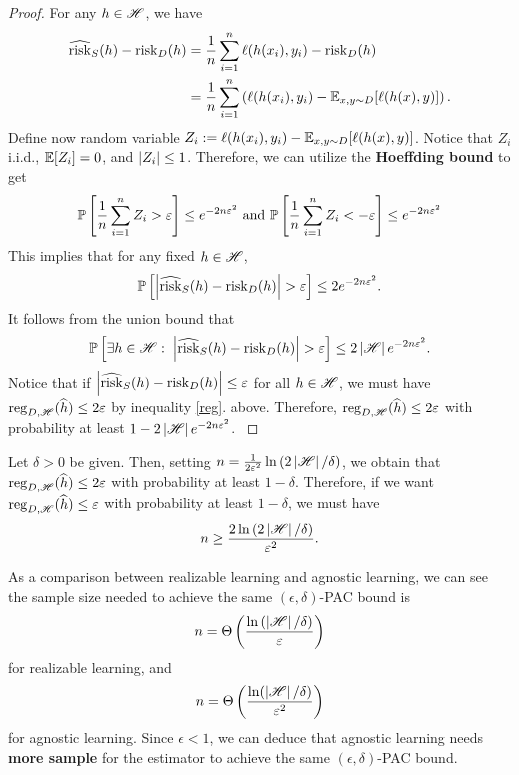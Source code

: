 \documentclass[a4paper]{article}
\begin{document}
\begin{proof}
{  For any $h \in \mathscr{H}$, we have
  \[
  \begin{aligned}
    \widehat{\operatorname{risk}}_S (h) - \operatorname{risk}_D(h) 
    &= \frac{1}{n} \sum_{i=1}^n \ell(h(x_i), y_i) 
    - \operatorname{risk}_D (h) \\
    &= \frac{1}{n} \sum_{i=1}^n \left( 
      \ell(h(x_i), y_i) - \mathbb{E}_{x, y \sim D} 
      [\ell(h(x), y)]
     \right).
  \end{aligned}
  \]
  Define now random variable $Z_i := \ell(h(x_i), y_i) - 
  \mathbb{E}_{x, y \sim D} [\ell(h(x), y)]$. Notice that $Z_i$ 
  i.i.d., $\mathbb{E}[Z_i] = 0$, and $\left\lvert Z_i\right\rvert \leq 1$. Therefore, 
  we can utilize the \textbf{Hoeffding bound} to get 
  \[
  \mathbb{P} \left[ \frac{1}{n} \sum_{i=1}^n Z_i > \varepsilon \right]
  \leq e^{- 2 n \varepsilon^2} \text{ and }
  \mathbb{P} \left[ \frac{1}{n} \sum_{i=1}^n Z_i < -\varepsilon \right]
  \leq e^{- 2 n \varepsilon^2}
  \]
  This implies that for any fixed $h \in \mathscr{H}$,  
  \[
  \mathbb{P} \left[ \left\lvert \widehat{\operatorname{risk}}_S(h) - \operatorname{risk}_D(h)\right\rvert > \varepsilon 
  \right] \leq 2 e^{-2 n \varepsilon^2}.
  \]
  It follows from the union bound that 
  \[
  \mathbb{P} \left[ \exists h \in \mathscr{H}: \; 
  \left\lvert \widehat{\operatorname{risk}}_S(h) - \operatorname{risk}_D(h)\right\rvert > \varepsilon \right] 
  \leq 2 \left\lvert \mathscr{H}\right\rvert e^{- 2 n \varepsilon^2}.
  \]
  Notice that if  
  $\left\lvert \widehat{\operatorname{risk}}_S (h) - \operatorname{risk}_D (h)\right\rvert \leq \varepsilon$
  for all $h \in \mathscr{H}$, we must have $\operatorname{reg}_{D, \mathscr{H}} 
  (\widehat{h}) \leq 2 \varepsilon$ by inequality \eqref{reg}.
  above. Therefore,
  $\operatorname{reg}_{D, \mathscr{H}} (\widehat{h}) \leq 2 \varepsilon$ with probability at least 
  $1 - 2 \left\lvert \mathscr{H}\right\rvert e^{- 2 n \varepsilon^2}$. 
}
\end{proof}

\begin{cor}
Let $\delta > 0$ be given. Then, 
setting 
$n = \frac{1}{2\varepsilon^2} \ln \left( 2 \left\lvert \mathscr{H}\right\rvert / 
\delta \right)$, we obtain that $\operatorname{reg}_{D, \mathscr{H}} (\widehat{h})
\leq 2\varepsilon$ with probability at least $1 - \delta$.
Therefore, if we want $\operatorname{reg}_{D, \mathscr{H}} 
(\widehat{h}) \leq \varepsilon$ with probability at least $1 - 
\delta$, we must have 
\[
  n \geq \frac{2 \ln 
  \left( 2 \left\lvert \mathscr{H}\right\rvert / \delta \right)}
  {\varepsilon^2}.
\]
\end{cor}

As a comparison between realizable learning and agnostic 
learning, we can see the sample size needed to 
achieve the same $(\epsilon, \delta)$-PAC bound is 
\[
n = \Theta \left( \frac{\ln \left( \left\lvert \mathscr{H}\right\rvert / \delta
\right)}{\varepsilon} \right)
\]
for realizable learning, and 
\[
n = \Theta \left( \frac{\ln(\left\lvert \mathscr{H}\right\rvert / \delta)}{\varepsilon^2} 
\right)
\]
for agnostic learning. Since $\epsilon < 1$, 
we can deduce that agnostic learning needs 
\textbf{more sample} for the estimator to achieve the 
same $(\epsilon, \delta)$-PAC bound.
\end{document}
